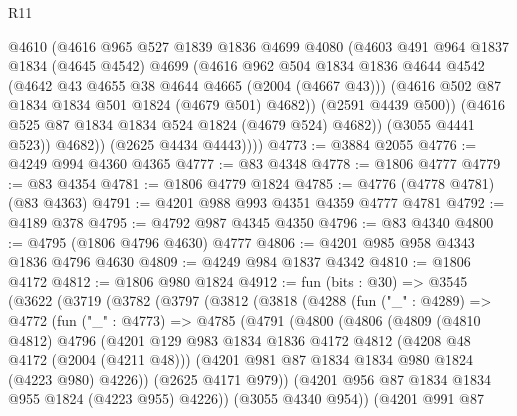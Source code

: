 \begin{lexlean}{R11}
\begin{coremodule}
                @4610
                (@4616
                  @965
                  @527
                  @1839
                  @1836
                  @4699
                  @4080
                  (@4603
                    @491
                    @964
                    @1837
                    @1834
                    (@4645 @4542)
                    @4699
                    (@4616
                      @962
                      @504
                      @1834
                      @1836
                      @4644
                      @4542
                      (@4642 @43 @4655 @38 @4644 @4665 (@2004 (@4667 @43)))
                      (@4616 @502 @87 @1834 @1834 @501 @1824 (@4679 @501) @4682))
                    (@2591 @4439 @500))
                  (@4616 @525 @87 @1834 @1834 @524 @1824 (@4679 @524) @4682))
                (@3055 @4441 @523))
              @4682))
          (@2625 @4434 @4443))))
@4773 := @3884 @2055
@4776 := @4249 @994 @4360 @4365
@4777 := @83 @4348
@4778 := @1806 @4777
@4779 := @83 @4354
@4781 := @1806 @4779 @1824
@4785 := @4776 (@4778 @4781) (@83 @4363)
@4791 := @4201 @988 @993 @4351 @4359 @4777 @4781
@4792 := @4189 @378
@4795 := @4792 @987 @4345 @4350
@4796 := @83 @4340
@4800 := @4795 (@1806 @4796 @4630) @4777
@4806 := @4201 @985 @958 @4343 @1836 @4796 @4630
@4809 := @4249 @984 @1837 @4342
@4810 := @1806 @4172
@4812 := @1806 @980 @1824
@4912 := fun (bits : @30) =>
  @3545
    (@3622
      (@3719
        (@3782
          (@3797
            (@3812
              (@3818
                (@4288
                  (fun ("_" : @4289) =>
                  @4772
                    (fun ("_" : @4773) =>
                    @4785
                      (@4791
                        (@4800
                          (@4806
                            (@4809
                              (@4810 @4812)
                              @4796
                              (@4201
                                @129
                                @983
                                @1834
                                @1836
                                @4172
                                @4812
                                (@4208 @48 @4172 (@2004 (@4211 @48)))
                                (@4201 @981 @87 @1834 @1834 @980 @1824 (@4223 @980) @4226))
                              (@2625 @4171 @979))
                            (@4201 @956 @87 @1834 @1834 @955 @1824 (@4223 @955) @4226))
                          (@3055 @4340 @954))
                        (@4201
                          @991
                          @87

\end{coremodule}
\end{lexlean}
